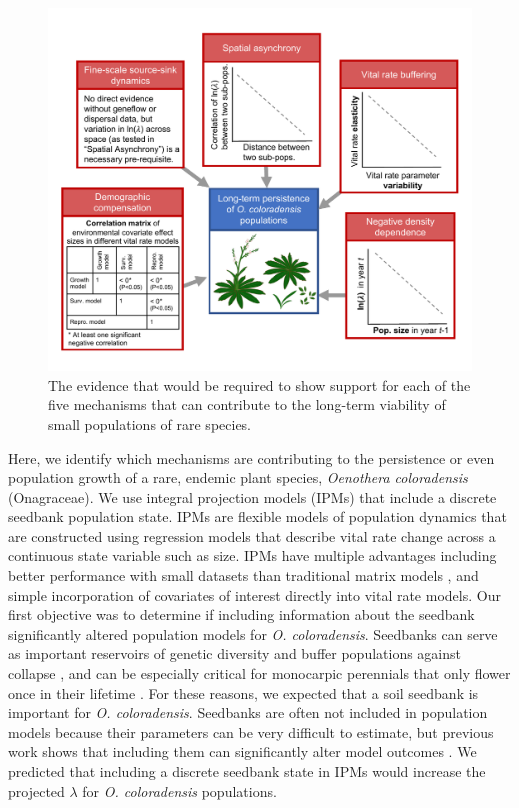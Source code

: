 \documentclass[12pt, letterpaper]{article}
\begin{document}
\begin{figure}[h]
  \centering
  \includegraphics[width=1\textwidth]{COBP_conceptualDiagram.pdf}
  \caption{The evidence that would be required to show support for each of the five mechanisms that can contribute to the long-term viability of small populations of rare species.}
  \label{fig:conceptualFigure}
\end{figure} 

Here, we identify which mechanisms are contributing to the persistence or even population growth of a rare, endemic plant species, \textit{Oenothera coloradensis} (Onagraceae). We use integral projection models (IPMs) \cite{Easterling2000} that include a discrete seedbank population state. IPMs are flexible models of population dynamics that are constructed using regression models that describe vital rate change across a continuous state variable such as size. IPMs have multiple advantages including better performance with small datasets than traditional matrix models \cite{Ramula2009IntegralHerbs}, and simple incorporation of covariates of interest directly into vital rate models. Our first objective was to determine if including information about the seedbank significantly altered population models for \textit{O. coloradensis}. Seedbanks can serve as important reservoirs of genetic diversity and buffer populations against collapse \cite{Vitalis2004WhenPerenniality, Jongejans2006WhatRange}, and can be especially critical for monocarpic perennials that only flower once in their lifetime \cite{Rees2006}. For these reasons, we expected that a soil seedbank is important for \textit{O. coloradensis}. Seedbanks are often not included in population models because their parameters can be very difficult to estimate, but previous work shows that including them can significantly alter model outcomes \cite{Paniw2017, Nguyen2019ConsequencesModels}. We predicted that including a discrete seedbank state in IPMs would increase the projected $\lambda$ for \textit{O. coloradensis} populations. 
\end{document}
